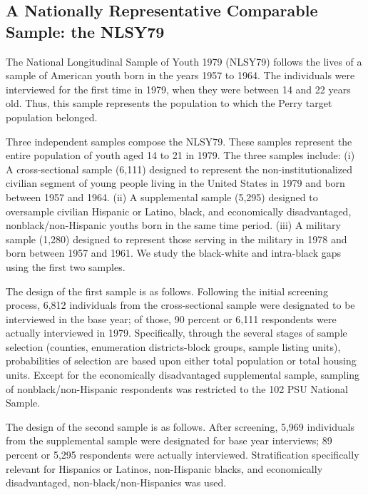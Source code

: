 \subsection{A Nationally Representative Comparable Sample: the NLSY79}
The National Longitudinal Sample of Youth 1979 (NLSY79) follows the lives of a sample of American youth born in the years 1957 to 1964. The individuals were interviewed for the first time in 1979, when they were between 14 and 22 years old. Thus, this sample represents the population to which the Perry target population belonged.

Three independent samples compose the NLSY79. These samples represent the entire population of youth aged 14 to 21 in 1979.  The three samples include: (i) A cross-sectional sample (6,111) designed to represent the non-institutionalized civilian segment of young people living in the United States in 1979 and born between 1957 and 1964. (ii) A supplemental sample (5,295) designed to oversample civilian Hispanic or Latino, black, and economically disadvantaged, nonblack/non-Hispanic youths born in the same time period. (iii) A military sample (1,280) designed to represent those serving in the military in 1978 and born between 1957 and 1961. We study the black-white and intra-black gaps using the first two samples.

The design of the first sample is as follows. Following the initial screening process, 6,812 individuals from the cross-sectional sample were designated to be interviewed in the base year; of those, 90 percent or 6,111 respondents were actually interviewed in 1979. Specifically, through the several stages of sample selection (counties, enumeration districts-block groups, sample listing units), probabilities of selection are based upon either total population or total housing units.  Except for the economically disadvantaged supplemental sample, sampling of nonblack/non-Hispanic respondents was restricted to the 102 PSU National Sample.

The design of the second sample is as follows. After screening, 5,969 individuals from the supplemental sample were designated for base year interviews; 89 percent or 5,295 respondents were actually interviewed.  Stratification specifically relevant for Hispanics or Latinos, non-Hispanic blacks, and economically disadvantaged, non-black/non-Hispanics was used.
 
